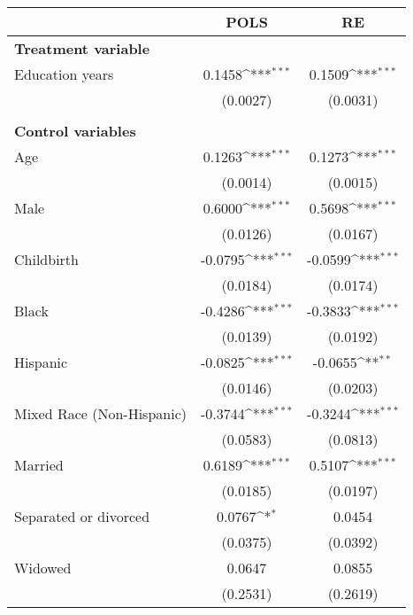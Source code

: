 {
\def\sym#1{\ifmmode^{#1}\else\(^{#1}\)\fi}
\begin{tabular}{l*{2}{c}}
\toprule
                    &\multicolumn{1}{c}{POLS}&\multicolumn{1}{c}{RE}\\
\midrule
\textbf{Treatment variable}&                     &                     \\
Education years     &      0.1458\sym{***}&      0.1509\sym{***}\\
                    &    (0.0027)         &    (0.0031)         \\
\\ \textbf{Control variables}&                     &                     \\
Age                 &      0.1263\sym{***}&      0.1273\sym{***}\\
                    &    (0.0014)         &    (0.0015)         \\
Male                &      0.6000\sym{***}&      0.5698\sym{***}\\
                    &    (0.0126)         &    (0.0167)         \\
Childbirth          &     -0.0795\sym{***}&     -0.0599\sym{***}\\
                    &    (0.0184)         &    (0.0174)         \\
Black               &     -0.4286\sym{***}&     -0.3833\sym{***}\\
                    &    (0.0139)         &    (0.0192)         \\
Hispanic            &     -0.0825\sym{***}&     -0.0655\sym{**} \\
                    &    (0.0146)         &    (0.0203)         \\
Mixed Race (Non-Hispanic)&     -0.3744\sym{***}&     -0.3244\sym{***}\\
                    &    (0.0583)         &    (0.0813)         \\
Married             &      0.6189\sym{***}&      0.5107\sym{***}\\
                    &    (0.0185)         &    (0.0197)         \\
Separated or divorced&      0.0767\sym{*}  &      0.0454         \\
                    &    (0.0375)         &    (0.0392)         \\
Widowed             &      0.0647         &      0.0855         \\
                    &    (0.2531)         &    (0.2619)         \\

\end{tabular}}
